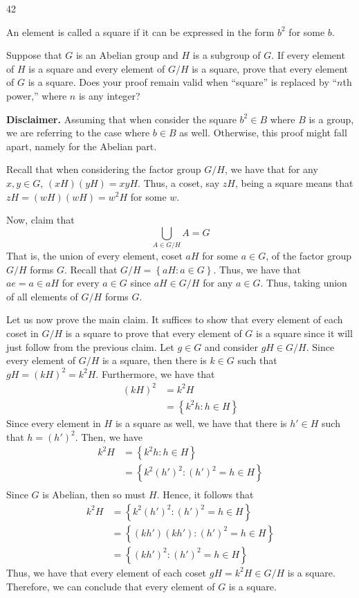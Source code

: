 \begin{hwproblem}
{42}{
    An element is called a square if it can be expressed in the form $b^2$ for some $b$.

    Suppose that $G$ is an Abelian group and $H$ is a subgroup of $G$. If every element of $H$ is a square and every element of $G / H$ is a square, prove that every element of $G$ is a square. Does your proof remain valid when ``square'' is replaced by ``$n$th power,'' where $n$ is any integer?
}

\textbf{Disclaimer.} Assuming that when consider the square \(b^2 \in B\) where \(B\) is a group, we are referring to the case where \(b \in B\) as well. Otherwise, this proof might fall apart, namely for the Abelian part.

Recall that when considering the factor group \(G/H\), we have that for any \(x, y \in G\), \( (xH)(yH) = xyH \). Thus, a coset, say \(zH\), being a square means that \( zH = (wH)(wH) = w^2H \) for some \(w\).

Now, claim that
\[
    \bigcup_{A \in G/H} A = G
\]
That is, the union of every element, coset \(aH\) for some \(a \in G\), of the factor group \(G/H\) forms \(G\). Recall that \(G/H = \left\{aH : a \in G\right\}\). Thus, we have that \(ae = a \in aH\) for every \(a \in G\) since \(aH \in G/H\) for any \(a \in G\). Thus, taking union of all elements of \(G/H\) forms \(G\).

Let us now prove the main claim. It suffices to show that every element of each coset in \(G/H\) is a square to prove that every element of \(G\) is a square since it will just follow from the previous claim. Let \(g \in G\) and consider \(gH \in G/H\). Since every element of \(G/H\) is a square, then there is \(k \in G\) such that \(gH = (kH)^2 = k^2H\). Furthermore, we have that
\[
\begin{aligned}
    (kH)^2 &= k^2H \\
           &= \left\{k^2h : h \in H\right\}
\end{aligned}
\]
Since every element in \(H\) is a square as well, we have that there is \(h' \in H\) such that \(h = (h')^2\). Then, we have
\[
\begin{aligned}
    k^2H &= \left\{k^2h : h \in H\right\} \\
         &= \left\{k^2(h')^2 : (h')^2 = h \in H\right\} \\
\end{aligned}
\]
Since \(G\) is Abelian, then so must \(H\). Hence, it follows that
\[
\begin{aligned}
    k^2H &= \left\{k^2(h')^2 : (h')^2 = h \in H\right\} \\
         &= \left\{(kh')(kh') : (h')^2 = h \in H\right\} \\
         &= \left\{(kh')^2 : (h')^2 = h \in H\right\}
\end{aligned}
\]
Thus, we have that every element of each coset \(gH = k^2H \in G/H\) is a square. Therefore, we can conclude that every element of \(G\) is a square.
\end{hwproblem}


